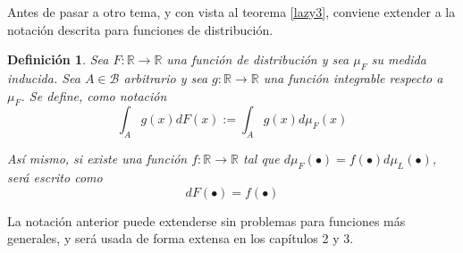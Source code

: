 \documentclass[12pt,letterpaper]{book}
\newtheorem{definicion}{Definición}[chapter]
\newcommand{\R}{\mathbb{R}}
\newcommand{\N}{\mathbb{N}}
\newcommand{\abso}[1]{\left| #1 \right|}
\begin{document}
Antes de pasar a otro tema, y con vista al teorema \ref{lazy3}, conviene extender a la notación descrita para funciones de distribución.

\begin{definicion}
Sea $F: \R\rightarrow\R$ una función de distribución y sea $\mu_F$ su medida inducida.
%
Sea $A \in \mathcal{B}$ arbitrario y sea $g: \R\rightarrow\R$ una función integrable respecto a $\mu_F$.
%
Se define, como notación
\begin{equation}
\int_A g(x) dF(x) := \int_A g(x) d\mu_F(x) 
\end{equation}

Así mismo, si existe una función $f: \R \rightarrow \R$ tal que $d\mu_F(\bullet) = f(\bullet) d\mu_L(\bullet) $, será escrito como
\begin{equation}
dF(\bullet) = f(\bullet) 
\end{equation}
\end{definicion}

La notación anterior puede extenderse sin problemas para funciones más generales, y será usada de forma extensa en los capítulos 2 y 3.


%
%
\end{document}
